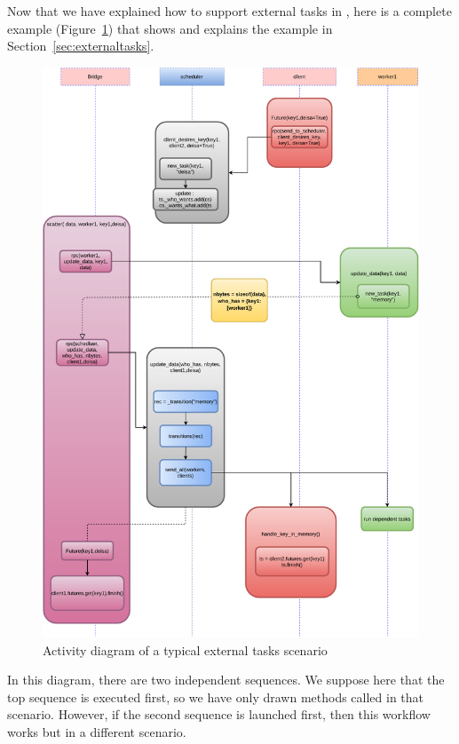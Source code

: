 Now that we have explained how to support external tasks in \dask, here is a complete example (Figure~\ref{figscatterDA}) that shows and explains the example in Section~\ref{sec:externaltasks}. 

\begin{figure}[h!]\centering
\includegraphics[scale=0.5]{figures/NewScatterDiagramAtcivity.pdf}
\caption{Activity diagram of a typical external tasks scenario}
\label{figscatterDA}
\end{figure}

In this diagram, there are two independent sequences. We suppose here that the top sequence is executed first, so we have only drawn methods called in that scenario. However, if the second sequence is launched first, then this workflow works but in a different scenario. 

